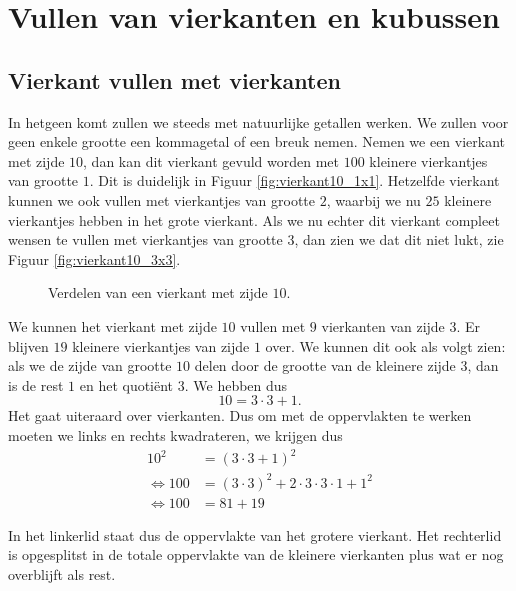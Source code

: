 
\section{Vullen van vierkanten en kubussen}

\subsection{Vierkant vullen met vierkanten}

In hetgeen komt zullen we steeds met natuurlijke getallen werken. We zullen voor geen enkele grootte een kommagetal of een breuk nemen. Nemen we een vierkant met zijde $10$, dan kan dit vierkant gevuld worden met $100$ kleinere vierkantjes van grootte $1$. Dit is duidelijk in Figuur \ref{fig:vierkant10_1x1}. Hetzelfde vierkant kunnen we ook vullen met vierkantjes van grootte $2$, waarbij we nu $25$ kleinere vierkantjes hebben in het grote vierkant. Als we nu echter dit vierkant compleet wensen te vullen met vierkantjes van grootte $3$, dan zien we dat dit niet lukt, zie Figuur \ref{fig:vierkant10_3x3}.

\begin{figure}[ht]
  \centering
  \caption{Verdelen van een vierkant met zijde $10$.}
  \label{fig:vierkant10}
\end{figure}

We kunnen het vierkant met zijde $10$ vullen met $9$ vierkanten van zijde $3$. Er blijven $19$ kleinere vierkantjes van zijde $1$ over. We kunnen dit ook als volgt zien: als we de zijde van grootte $10$ delen door de grootte van de kleinere zijde $3$, dan is de rest $1$ en het quoti\"ent $3$. We hebben dus
$$
10 = 3\cdot 3 + 1.
$$
Het gaat uiteraard over vierkanten. Dus om met de oppervlakten te werken moeten we links en rechts kwadrateren, we krijgen dus
\begin{align*}
  10^2  &= (3\cdot 3 + 1)^2\\
  \Leftrightarrow 100   &= (3\cdot 3)^2 + 2\cdot 3\cdot 3\cdot 1 + 1^2\\
  \Leftrightarrow 100   &= 81 + 19
\end{align*}

In het linkerlid staat dus de oppervlakte van het grotere vierkant. Het rechterlid is opgesplitst in de totale oppervlakte van de kleinere vierkanten plus wat er nog overblijft als rest.

